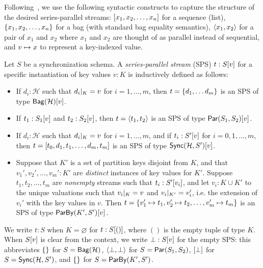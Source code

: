 Following~, we use the following syntactic constructs to capture the structure of the desired series-parallel streams: $\spsseq{x_1, x_2, \ldots, x_n}$ for
a sequence (list), $\spsbag{x_1, x_2, \ldots, x_n}$ for a bag (with standard bag
equality semantics), $\spspargen{x_1, x_2}$ for a pair of $x_1$ and $x_2$ where
$x_1$ and $x_2$ are thought of as parallel instead of sequential,
and $\keyed{v}{x}$ to represent a key-indexed value.

\begin{definition}
\label{45:def:trace}
Let $S$ be a synchronization schema.
A \emph{series-parallel stream} (SPS) $t : \spstype{v}{S}$ for a specific instantiation of key values $v : K$ is inductively defined as follows:
\begin{itemize}
\item
If $d_i : \mathcal{H}$ such that $\tuprestrict{d_i}{K} = v$
for $i = 1, \ldots, m$,
then $t = \spsbag{d_1, \ldots d_m}$
is an SPS of type $\spstype{v}{\relleaf{\mathcal{H}}}$.
\item
If $t_1 : \spstype{v}{S_1}$
and $t_2 : \spstype{v}{S_2}$,
then $t = \spspar{t_1}{t_2}$
is an SPS of type $\spstype{v}{\parcomp{S_1}{S_2}}$.
\item
If $d_i : \mathcal{H}$ such that $\tuprestrict{d_i}{K} = v$
for $i = 1, \ldots, m$,
and if $t_i: \spstype{v}{S'}$ for $i = 0, 1, \ldots, m$,
then
$t = \spsseq{t_0, d_1, t_1, \ldots, d_m, t_m}$
is an SPS of type $\spstype{v}{\hier{\mathcal{H}}{S'}}$.
\item
Suppose that $K'$ is a set of partition keys disjoint from $K$,
and that $v_1', v_2', \ldots, v_m': K'$ are \emph{distinct} instances
of key values for $K'$.
Suppose $t_1, t_2, \ldots, t_m$ are \emph{nonempty} streams such that
$t_i: \spstype{v_i}{S'}$,
and let $v_i: K \cup K'$ to the unique valuations
such that $\tuprestrict{v_i}{K} = v$ and $\tuprestrict{v_i}{K'} = v_i'$,
i.e. the extension of $v_i'$ with the key values in $v$.
Then
$t = \spsbag{\keyed{v_1'}{t_1}, \keyed{v_2'}{t_2}, \ldots, \keyed{v_m'}{t_m}}$
is an SPS of type
$\spstype{v}{\keyby{K'}{S'}}$.
\end{itemize}
\end{definition}

We write $t: S$ when $K = \varnothing$ for $t: \spstype{()}{S}$, where $()$ is the empty tuple of type $K$.
When $\spstype{v}{S}$ is clear from the context,
we write $\spsemp: \spstype{v}{S}$ for the empty SPS:
this abbreviates $\spsbag{}$ for $S = \relleaf{\mathcal{H}}$,
$\spspar{\spsemp}{\spsemp}$ for $S = \parcomp{S_1}{S_2}$,
$\spsseq{\bot}$ for $S = \hier{\mathcal{H}}{S'}$,
and $\spsbag{}$ for $S = \keyby{K'}{S'}$.

